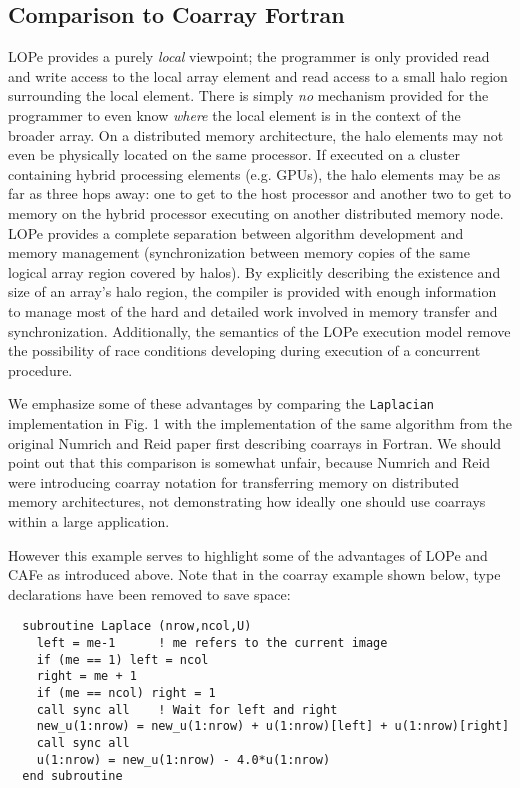 \subsection{Comparison to Coarray Fortran}

LOPe provides a purely \emph{local} viewpoint; the programmer is only provided read and write access
to the local array element and read access to a small halo region surrounding the local element.
There is simply \emph{no} mechanism provided for the programmer to even know \emph{where} the local
element is in the context of the broader array.  On a distributed memory architecture, the halo
elements may not even be physically located on the same processor.  If executed on a cluster
containing hybrid processing elements (e.g. GPUs), the halo elements may be as far as three hops
away: one to get to the host processor and another two to get to memory on the hybrid processor
executing on another distributed memory node.  LOPe provides a complete separation between algorithm
development and memory management (synchronization between memory copies of the same logical
array region covered by halos).  By explicitly describing the existence and size of an array's halo
region, the compiler is provided with enough information to manage most of the hard and detailed
work involved in memory transfer and synchronization.  Additionally, the semantics of the LOPe
execution model remove the possibility of race conditions developing during execution of a
concurrent procedure.

We emphasize some of these advantages by comparing the \texttt{Laplacian} implementation in Fig. 1 with the
implementation of the same algorithm from the original Numrich and Reid
paper\cite{Numrich:1998:CFP:289918.289920} first describing coarrays in Fortran.  We should point
out that this comparison is somewhat unfair, because Numrich and Reid were introducing coarray
notation for transferring memory on distributed memory architectures, not demonstrating how ideally
one should use coarrays within a large application.

However this example serves
to highlight some of the advantages of LOPe and CAFe as introduced above.  Note that in the coarray
example shown below, type declarations have been removed to save space:
{\small \begin{verbatim}
  subroutine Laplace (nrow,ncol,U)
    left = me-1      ! me refers to the current image
    if (me == 1) left = ncol
    right = me + 1
    if (me == ncol) right = 1
    call sync all    ! Wait for left and right
    new_u(1:nrow) = new_u(1:nrow) + u(1:nrow)[left] + u(1:nrow)[right]
    call sync all
    u(1:nrow) = new_u(1:nrow) - 4.0*u(1:nrow)
  end subroutine
\end{verbatim}}

